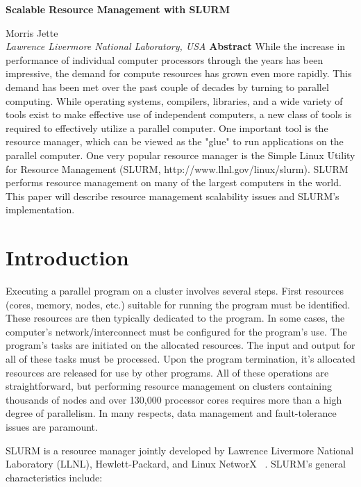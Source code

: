\documentclass[10pt,onecolumn,times]{../common/llncs}
\def\ctit{Scalable Resource Management with SLURM}
\def\ucrl{UCRL-JC-TBD}
\def\auth{Morris Jette}
\def\pubdate{January 23, 2006}
\def\journal{Operating Systems Reviews}
\begin{document}

\vspace*{35mm}
\noindent\Large
\textbf{\ctit}
\baselineskip
\noindent\large
{Morris Jette \\
{\em Lawrence Livermore National Laboratory, USA}
\baselineskip
\noindent\large
\textbf{Abstract}
\baselineskip
\noindent\normalsize
While the increase in performance of individual computer 
processors through the years has been impressive, the demand
for compute resources has grown even more rapidly. 
This demand has been met over the past couple of decades by 
turning to parallel computing. 
While operating systems, compilers, libraries, and a wide 
variety of tools exist to make effective use of independent 
computers, a new class of tools is required to effectively 
utilize a parallel computer. 
One important tool is the resource manager, which can be viewed 
as the "glue" to run applications on the parallel computer. 
One very popular resource manager is the Simple Linux
Utility for Resource Management (SLURM, 
http://www.llnl.gov/linux/slurm). 
SLURM performs resource management on many of the largest 
computers in the world.
This paper will describe resource management scalability 
issues and SLURM's implementation.


\section{Introduction}

Executing a parallel program on a cluster involves several 
steps. First resources (cores, memory, nodes, etc.) suitable 
for running the program must be identified. These resources 
are then typically dedicated to the program. In some 
cases, the computer's network/interconnect must be 
configured for the program's use. The program's tasks
are initiated on the allocated resources. The input and 
output for all of these tasks must be processed. 
Upon the program termination, it's allocated resources 
are released for use by other programs. 
All of these operations are straightforward, but performing 
resource management on clusters containing thousands of 
nodes and over 130,000 processor cores requires more 
than a high degree of parallelism.
In many respects, data management and fault-tolerance issues
are paramount.

SLURM is a resource manager jointly developed by Lawrence 
Livermore National Laboratory (LLNL), 
Hewlett-Packard, and Linux NetworX
~\cite{SLURM2003,Yoo2003,SlurmWeb}.
SLURM's general characteristics include:

}
\end{document}
